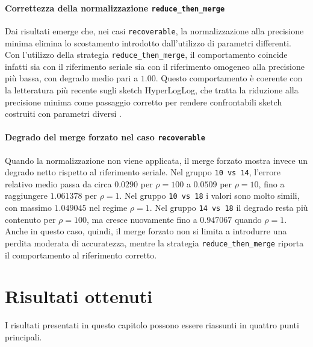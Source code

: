   \paragraph{Correttezza della normalizzazione \texttt{reduce\_then\_merge}}

  Dai risultati emerge che, nei casi \texttt{recoverable}, la normalizzazione alla
  precisione minima elimina lo scostamento introdotto dall'utilizzo di parametri differenti. 
  Con l'utilizzo della strategia \texttt{reduce\_then\_merge}, il comportamento coincide infatti
  sia con il riferimento seriale sia con il riferimento omogeneo alla precisione
  più bassa, con degrado medio pari a \(1.00\). Questo comportamento è coerente
  con la letteratura più recente sugli sketch HyperLogLog, che tratta la
  riduzione alla precisione minima come passaggio corretto per rendere
  confrontabili sketch costruiti con parametri diversi
  \cite{Ertl_2017_HLLAlgorithms}.

  \paragraph{Degrado del merge forzato nel caso \texttt{recoverable}}

  Quando la normalizzazione non viene applicata, il merge forzato mostra invece un
  degrado netto rispetto al riferimento seriale. Nel gruppo \texttt{10 vs 14},
  l'errore relativo medio passa da circa \(0.0290\) per \(\rho=100\) a
  \(0.0509\) per \(\rho=10\), fino a raggiungere \(1.061378\) per \(\rho=1\).
  Nel gruppo \texttt{10 vs 18} i valori sono molto simili, con massimo
  \(1.049045\) nel regime \(\rho=1\). Nel gruppo \texttt{14 vs 18} il degrado
  resta più contenuto per \(\rho=100\), ma cresce nuovamente fino a
  \(0.947067\) quando \(\rho=1\). Anche in questo caso, quindi, il merge forzato
  non si limita a introdurre una perdita moderata di accuratezza, mentre la
  strategia \texttt{reduce\_then\_merge} riporta il comportamento al riferimento
  corretto.

\section{Risultati ottenuti}

I risultati presentati in questo capitolo possono essere riassunti in quattro
punti principali.

